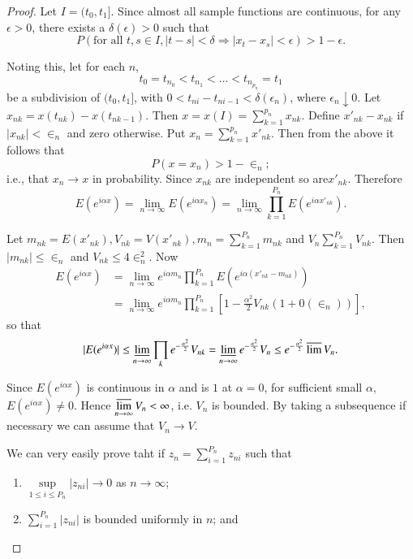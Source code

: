 \begin{proof}
  Let $I=(t_0,t_1]$. Since almost all sample functions are continuous,
    for any $\epsilon >0$, there exists a $\delta (\epsilon)>0$ such that 
    $$
    P(\text{for all\ }t,s \in I,|t-s|< \delta \Rightarrow |x_t-x_s|<
    \epsilon)> 1- \epsilon. 
    $$

Noting this, let for each $n$,
$$
t_0=t_{n_0}<t_{n_1}< \ldots < t_{n_{p_n}}=t_1
$$
be a subdivision of $(t_0,t_1]$, with $0<t_{ni}-t_{n i-1}< \delta
  (\epsilon_n)$, where $\epsilon_n \downarrow 0$. Let
  $x_{nk}=x(t_{nk})-x(t_{nk-1})$. Then 
  $x=x(I)=\sum\limits^{p_n}_{k=1}x_{nk}$. Define $x'_{nk}-x_{nk}$ if
  $|x_{nk}|< \in_n$ and zero otherwise. Put $x_n=\sum
  \limits^{p_n}_{k=1}x'_{nk}$. Then from the above it follows that 
  $$
  P(x=x_n)>1- \in_n ;
  $$
  i.e., that $x_n \to x$ in probability. Since $x_{nk}$ are
  independent so are\pageoriginale $x'_{nk}$. Therefore 
  $$
  E(e^{i\alpha x})=\lim_{n \to \infty}E(e^{i\alpha x_n})=\lim_{n \to
    \infty} \prod^{P_n}_{k=1}E(e^{i\alpha x'_{nk}}). 
  $$ 

  Let $m_{nk}=E(x'_{nk}),V_{nk}=V(x'_{nk}),m_n=\sum
  \limits^{P_n}_{k=1}m_{nk}$ and $V_n \sum
  \limits^{P_n}_{k=1}V_{nk}$. Then $|m_{nk}|\leq \in_n$ and
  $V_{nk}\leq 4 \in^2_n$. Now 
  \begin{align*}
    E(e^{i\alpha x})&=\lim_{n \to \infty} e^{i\alpha
      m_n}\prod^{P_n}_{k=1} E(e^{i \alpha (x'_{nk}-m_{nk})})\\ 
    &=\lim_{n \to \infty} e^{i\alpha m_n}\prod^{P_n}_{k=1}\left[1-
      \frac{\alpha^2}{2}V_{nk}(1+0(\in_n))\right], 
  \end{align*}
  so that
  $$
  |E(e^{i\alpha x})|\leq \varliminf_{n \to \infty} \prod _k
  e^{-\frac{\alpha^2}{2}}V_{nk}=\varliminf_{n \to
    \infty}e^{-\frac{\alpha^2}{2}}V_n \leq e^{-\frac{\alpha^2}{2}}
  \varlimsup V_n. 
  $$

Since $E(e^{i\alpha x})$ is continuous in $\alpha$ and is $1$ at $\alpha=0$,
for sufficient small $\alpha$, $E(e^{i\alpha x})\neq 0$. Hence
$\varlimsup\limits_{n \to \infty} V_n < \infty$, i.e. $V_n$ is bounded. By
taking a subsequence if necessary we can assume that $V_n \to V$. 

We can very easily prove taht if $z_n=\sum\limits^{P_n}_{i=1}z_{ni}$ such that 
\begin{enumerate}
\renewcommand{\labelenumi}{(\theenumi)}
\item $\sup\limits_{1 \leq i \leq P_n}|z_{ni}|\to 0$ as $n \to \infty$;

\item $\sum\limits^{P_n}_{i=1}|z_{ni}|$ is bounded uniformly in $n$; and


\end{enumerate}
\end{proof}
